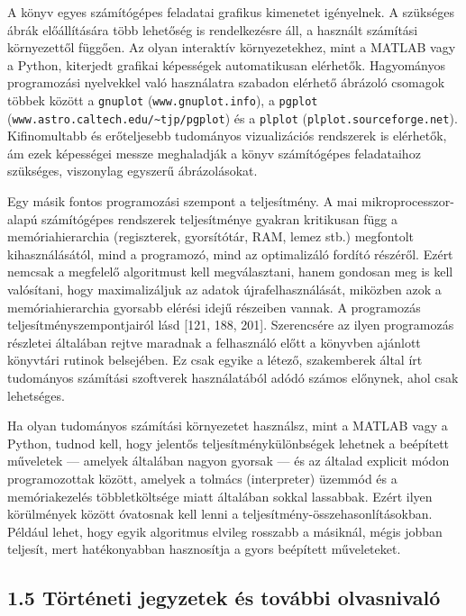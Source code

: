 \documentclass[
  magyar,
  11pt]{article}
\begin{document}
A könyv egyes számítógépes feladatai grafikus kimenetet igényelnek. A
szükséges ábrák előállítására több lehetőség is rendelkezésre áll, a
használt számítási környezettől függően. Az olyan interaktív
környezetekhez, mint a MATLAB vagy a Python, kiterjedt grafikai
képességek automatikusan elérhetők. Hagyományos programozási nyelvekkel
való használatra szabadon elérhető ábrázoló csomagok többek között a
\texttt{gnuplot} (\texttt{www.gnuplot.info}), a \texttt{pgplot}
(\texttt{www.astro.caltech.edu/\textasciitilde{}tjp/pgplot}) és a
\texttt{plplot} (\texttt{plplot.sourceforge.net}). Kifinomultabb és
erőteljesebb tudományos vizualizációs rendszerek is elérhetők, ám ezek
képességei messze meghaladják a könyv számítógépes feladataihoz
szükséges, viszonylag egyszerű ábrázolásokat.

Egy másik fontos programozási szempont a teljesítmény. A mai
mikroprocesszor-alapú számítógépes rendszerek teljesítménye gyakran
kritikusan függ a memóriahierarchia (regiszterek, gyorsítótár, RAM,
lemez stb.) megfontolt kihasználásától, mind a programozó, mind az
optimalizáló fordító részéről. Ezért nemcsak a megfelelő algoritmust
kell megválasztani, hanem gondosan meg is kell valósítani, hogy
maximalizáljuk az adatok újrafelhasználását, miközben azok a
memóriahierarchia gyorsabb elérési idejű részeiben vannak. A programozás
teljesítményszempontjairól lásd {[}121, 188, 201{]}. Szerencsére az
ilyen programozás részletei általában rejtve maradnak a felhasználó
előtt a könyvben ajánlott könyvtári rutinok belsejében. Ez csak egyike a
létező, szakemberek által írt tudományos számítási szoftverek
használatából adódó számos előnynek, ahol csak lehetséges.

Ha olyan tudományos számítási környezetet használsz, mint a MATLAB vagy
a Python, tudnod kell, hogy jelentős teljesítménykülönbségek lehetnek a
beépített műveletek --- amelyek általában nagyon gyorsak --- és az
általad explicit módon programozottak között, amelyek a tolmács
(interpreter) üzemmód és a memóriakezelés többletköltsége miatt
általában sokkal lassabbak. Ezért ilyen körülmények között óvatosnak
kell lenni a teljesítmény-összehasonlításokban. Például lehet, hogy
egyik algoritmus elvileg rosszabb a másiknál, mégis jobban teljesít,
mert hatékonyabban hasznosítja a gyors beépített műveleteket.

\subsection{1.5 Történeti jegyzetek és további
olvasnivaló}\label{tuxf6rtuxe9neti-jegyzetek-uxe9s-tovuxe1bbi-olvasnivaluxf3}
\end{document}
